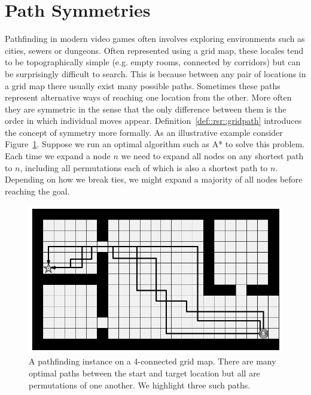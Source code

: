
\section{Path Symmetries}
Pathfinding in modern video games often involves exploring environments such
as cities, sewers or dungeons. Often represented using a grid map, these
locales tend to be topographically simple (e.g. empty rooms, connected by
corridors) but can be surprisingly difficult to search.  This is because
between any pair of locations in a grid map there usually exist many possible
paths. Sometimes these paths represent alternative ways of reaching one
location from the other. More often they are symmetric in the sense that the
only difference between them is the order in which individual moves appear.
Definition~\ref{def::rsr::gridpath} introduces the concept of symmetry more
formally.  As an illustrative example consider
Figure~\ref{fig::rsr::symmetry}.  Suppose we run an optimal algorithm such as
A* to solve this problem.  Each time we expand a node $n$ we need to expand
all nodes on any shortest path to $n$, including all permutations each of which
is also a shortest path to $n$. Depending on how we break ties, we
might expand a majority of all nodes before reaching the goal.

\begin{figure}[tb]
\begin{center}
\includegraphics[scale=0.30, trim = 10mm 10mm 10mm 0mm]{chapter_rsr/diagrams/symmetry.png}
\end{center}
\vspace{-3pt}
\caption[An example of path symmetry]{
\small
A pathfinding instance on a 4-connected grid map. There are many optimal
paths between the start and target location but all are permutations of 
one another. We highlight three such paths.}

\label{fig::rsr::symmetry}
\end{figure}

